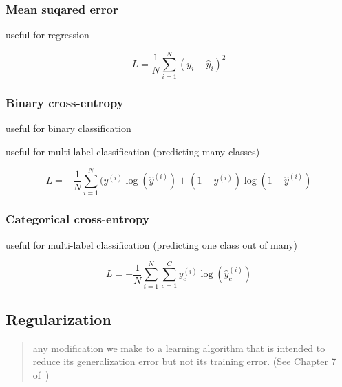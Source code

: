 \documentclass[11pt]{article}
\begin{document}
\subsubsection{Mean suqared error}

useful for regression

\begin{equation}
    L = \frac{1}{N} \sum^N_{i=1} (y_i- \hat{y} _i )^2
\end{equation}

\subsubsection{Binary cross-entropy}

useful for binary classification

useful for multi-label classification (predicting many classes)

\begin{equation}
    L = -\frac{1}{N} \sum^N_{i=1} (y^{(i)}\log(\hat{y}^{(i)})+(1-y^{(i)})\log(1-\hat{y}^{(i)})
\end{equation}

\subsubsection{Categorical cross-entropy}

useful for multi-label classification (predicting one class out of many)

\begin{equation}
    L = - \frac 1 N \sum^N_{i=1}\sum^C_{c=1} y_c^{(i)}\log(\hat{y}_c^{(i)})
\end{equation}

\subsection{Regularization}

\begin{quote}
    any modiﬁcation we make to a learning algorithm that is intended to reduce its generalization error but not its training error. (See Chapter 7 of~\cite{Goodfellow-et-al-2016})
\end{quote}
\end{document}
